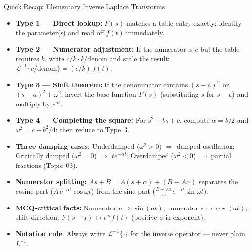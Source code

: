 \documentclass[12pt,a4paper]{article}
\begin{document}
\begin{learnbox}{Quick Recap: Elementary Inverse Laplace Transforms}
\begin{itemize}[leftmargin=*]
  \item \textbf{Type 1 --- Direct lookup:} $F(s)$ matches a table entry exactly; identify
        the parameter(s) and read off $f(t)$ immediately.
  \item \textbf{Type 2 --- Numerator adjustment:} If the numerator is $c$ but the table
        requires $k$, write $c/k \cdot k/\text{denom}$ and scale the result:
        $\mathcal{L}^{-1}\{c/\text{denom}\} = (c/k)\,f(t)$.
  \item \textbf{Type 3 --- Shift theorem:} If the denominator contains $(s-a)^n$ or
        $(s-a)^2+\omega^2$, invert the base function $F(s)$ (substituting $s$ for $s-a$)
        and multiply by $e^{at}$.
  \item \textbf{Type 4 --- Completing the square:} For $s^2+bs+c$, compute $\alpha = b/2$
        and $\omega^2 = c - b^2/4$; then reduce to Type~3.
  \item \textbf{Three damping cases:} Underdamped ($\omega^2>0$) $\Rightarrow$ damped
        oscillation; Critically damped ($\omega^2=0$) $\Rightarrow$ $te^{-\alpha t}$;
        Overdamped ($\omega^2<0$) $\Rightarrow$ partial fractions (Topic~03).
  \item \textbf{Numerator splitting:} $As+B = A(s+\alpha)+(B-A\alpha)$ separates the
        cosine part ($A\,e^{-\alpha t}\cos\omega t$) from the sine part
        ($\frac{B-A\alpha}{\omega}e^{-\alpha t}\sin\omega t$).
  \item \textbf{MCQ-critical facts:} Numerator $a \Rightarrow \sin(at)$; numerator
        $s \Rightarrow \cos(at)$; shift direction: $F(s-a) \leftrightarrow e^{at}f(t)$
        (positive $a$ in exponent).
  \item \textbf{Notation rule:} Always write $\mathcal{L}^{-1}\{\cdot\}$ for the inverse
        operator --- never plain $L^{-1}$.
\end{itemize}
\end{learnbox}
\end{document}
